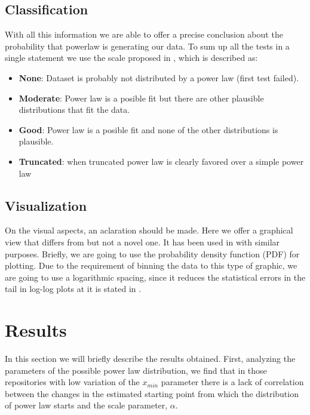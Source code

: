 \documentclass[conference]{IEEEtran}
\begin{document}
\subsection{Classification}

With all this information we are able to offer a precise conclusion about the 
probability that powerlaw is generating our data. To sum up all the tests in a single 
statement we use the scale proposed in \cite{clauset2009power}, which is described as:
\begin{itemize}
	\item \textbf{None}: Dataset is probably not distributed by a power law (first test failed).   
	\item \textbf{Moderate}: Power law is a posible fit but there are other plausible distributions that fit the data.
	\item \textbf{Good}: Power law is a posible fit and none of the other distributions is plausible.
	\item \textbf{Truncated}: when truncated power law is clearly favored over a simple power law
\end{itemize}


\subsection{Visualization}
 
On the visual aspects, an aclaration should be made. Here we offer a graphical view that differs from \cite{merelo2017self}
but not a novel one. It has been used in \cite{arafat2009commit} with similar purposes. 
Briefly, we are going to use the probability density function (PDF) for plotting. Due to the 
requirement of binning the data to this type of graphic, we are going to use a
logarithmic spacing, since it reduces the statistical errors in the tail in log-log 
plots at it is stated in \cite{newman2005power}.




\section{Results}
\label{res}
%
In this section we will briefly describe the results obtained. %
First, analyzing the parameters of the possible power law distribution, we find that in those repositories with low variation of the $x_{min}$ parameter there is a lack of correlation between the changes in the estimated starting point from which the distribution of power law starts and the scale parameter, $\alpha$. %
\end{document}
